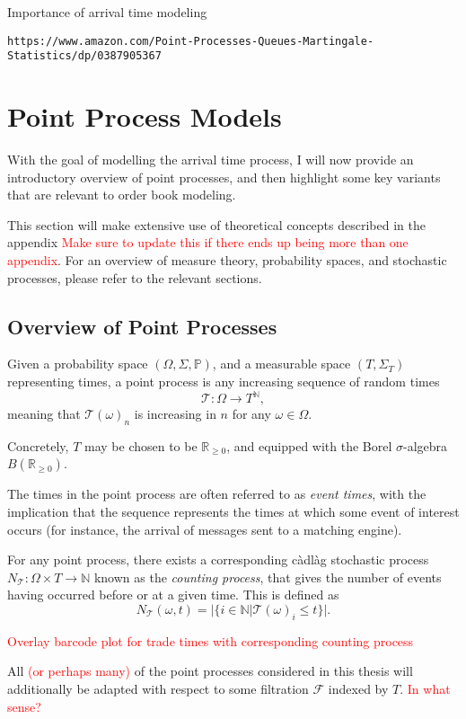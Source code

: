 \documentclass[honours,12pt]{unswthesis}
\numberwithin{equation}{section}
\begin{document}
Importance of arrival time modeling

\texttt{https://www.amazon.com/Point-Processes-Queues-Martingale-Statistics/dp/0387905367}

\chapter{Point Process Models}
With the goal of modelling the arrival time process, I will now provide an introductory overview of point processes, and then highlight some key variants that are relevant to order book modeling.

This section will make extensive use of theoretical concepts described in the appendix \textcolor{red}{Make sure to update this if there ends up being more than one appendix}. For an overview of measure theory, probability spaces, and stochastic processes, please refer to the relevant sections.

\section{Overview of Point Processes}
Given a probability space $(\Omega,\Sigma,\mathbb P)$, and a measurable space $(T,\Sigma_T)$ representing times, a point process is any increasing sequence of random times $$\mathcal T : \Omega\to T^\mathbb{N},$$
meaning that $\mathcal{T}(\omega)_n$ is increasing in $n$ for any $\omega\in\Omega$.

Concretely, $T$ may be chosen to be $\mathbb{R}_{\geq 0}$, and equipped with the Borel $\sigma$-algebra $B\left(\mathbb{R}_{\geq 0}\right)$.

The times in the point process are often referred to as \textit{event times}, with the implication that the sequence represents the times at which some event of interest occurs (for instance, the arrival of messages sent to a matching engine).

{\noindent}For any point process, there exists a corresponding càdlàg stochastic process $N_{\mathcal T}:\Omega\times T\to\mathbb{N}$ known as the \textit{counting process}, that gives the number of events having occurred before or at a given time. This is defined as
$$N_{\mathcal T}(\omega,t) = \vert \{i\in\mathbb N \vert \mathcal{T}(\omega)_i \leq t\} \vert.$$

\textcolor{red}{Overlay barcode plot for trade times with corresponding counting process}

All \textcolor{red}{(or perhaps many)} of the point processes considered in this thesis will additionally be adapted with respect to some filtration $\mathcal F$ indexed by $T$. \textcolor{red}{In what sense?}
\end{document}
